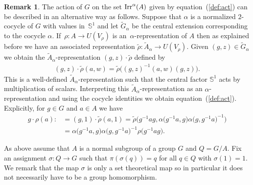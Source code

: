 \documentclass[pdftex]{sigma}
\def\S{\mathbb{S}}
\DeclareMathOperator{\Irr}{\textup{Irr}}
\theoremstyle{definition}
\newtheorem{Rem}[Th]{Remark}
\numberwithin{equation}{section}
\begin{document}
\begin{Rem}The action of $G$ on the set $\Irr^{\alpha}(A)$ given by equation~(\ref{def:act}) can be
described in an alternative way as follows. Suppose that $\alpha$ is a normalized $2$-cocycle of
$G$ with values in~$\S^{1}$ and let $\widetilde{G}_{\alpha}$ be the central extension corresponding
to the cocycle $\alpha$. If~$\rho\colon A\rightarrow U(V_{\rho})$ is an~$\alpha$-representation of $A$
then as explained before we have an associated representation \mbox{$\tilde{\rho}\colon \tilde{A}_{\alpha}\to U(V_{\rho})$}.
Given $(g,z)\in \widetilde{G}_{\alpha}$ we obtain the $\tilde{A}_{\alpha}$-representation
$(g,z)\cdot \tilde{\rho}$ defined by
\begin{gather*}
(g,z)\cdot \tilde{\rho}(a,w)=\tilde{\rho}\big((g,z)^{-1}(a,w)(g,z)\big).
\end{gather*}
This is a well-defined $\tilde{A}_{\alpha}$-representation such that the central factor
$\S^{1}$ acts by multiplication of scalars. Interpreting this $\tilde{A}_{\alpha}$-representation as an
$\alpha$-representation and using the cocycle identities we obtain equation~(\ref{def:act}). Explicitly,
for $g\in G$ and $a\in A$ we have
\begin{align*}
g\cdot \rho(a):\!&=(g,1)\cdot \tilde{\rho}(a,1)= \tilde{\rho}\big(g^{-1}ag,\alpha\big(g^{-1}a,g\big)\alpha\big(g,g^{-1}a\big)^{-1}\big)
\\
&=\alpha\big(g^{-1}a,g\big)\alpha\big(g,g^{-1}a\big)^{-1} \rho\big(g^{-1}ag\big).
\end{align*}
\end{Rem}


As above assume that $A$ is a normal subgroup of a group $G$ and $Q=G/A$. Fix an assignment
$\sigma \colon Q \rightarrow G$ such that $\pi(\sigma(q)) = q$ for all $q \in Q$ with $\sigma(1)
= 1$. We remark that the map $\sigma$ is only a set theoretical map so in particular it does
not necessarily have to be a group homomorphism.
\end{document}
